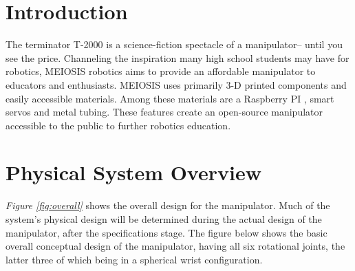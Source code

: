 \documentclass[12pt]{report}
\begin{document}
\normalem

{\tableofcontents\let\clearpage\relax\listoffigures\let\clearpage\relax\listoftables}
\clearpage
\newpage



\onehalfspacing
\section{Introduction}
The terminator T-2000 is a science-fiction spectacle of a manipulator-- until you see the price. Channeling the inspiration many high school students may have for robotics, MEIOSIS robotics aims to provide an affordable manipulator to educators and enthusiasts. MEIOSIS uses primarily 3-D printed components and easily accessible materials. Among these materials are a Raspberry PI , smart servos and metal tubing. These features create an open-source manipulator accessible to the public to further robotics education.
\section{Physical System Overview}
\emph{Figure \ref{fig:overall}} shows the overall design for the manipulator. Much of the system’s physical design will be determined during the actual design of the manipulator, after the specifications stage. The figure below shows the basic overall conceptual design of the manipulator, having all six rotational joints, the latter three of which being in a spherical wrist configuration.
\end{document}
